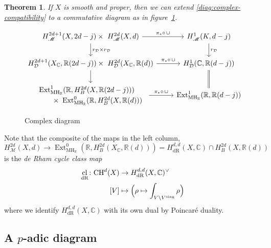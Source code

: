 \documentclass[11pt, a4paper, reqno]{amsart}
\theoremstyle{definition}
\theoremstyle{plain}
\newtheorem{theorem}[definition]{Theorem}
\theoremstyle{remark}
\DeclareMathOperator{\Ext}{Ext}
\DeclareMathOperator{\cl}{cl}
\DeclareMathOperator{\dR}{dR}
\DeclareMathOperator{\mot}{\mathscr{M}}
\newcommand{\numberset}{\mathbb}
\newcommand{\C}{\numberset{C}}
\newcommand{\R}{\numberset{R}}
\newcommand{\CH}{\mathrm{CH}}
\newcommand{\MH}{\mathrm{MH}}
\newcommand{\del}{\mathcal{D}}
\newcommand{\regulator}[1]{r_{#1}}
\newcommand{\rD}{\regulator{\del}}
\begin{document}
  \begin{theorem}
   If $X$ is smooth and proper, then we can extend \eqref{diag:complex-compatibility} to a commutative diagram as in figure~\ref{diag:complex-diagram}.
  \end{theorem}

  \begin{figure}[b]
   \centering
   \begin{mdframed}
    \caption{Complex diagram}
    \label{diag:complex-diagram}
    \[
     \begin{tikzcd}
      H^{2d+1}_{\mot}(X,2d-j) \times\ H^{2d}_{\mot}(X,d)
      \arrow["\pi_* \circ\, \cup"]{r} \arrow["\rD \times \rD"]{d} &
      H^1_{\mot}(K,d-j) \arrow[d,"\rD"] \\
       H_{\del}^{2d+1}(X_{\C}, \R(2d-j))
       \times\ H_{\del}^{2d}(X_{\C}, \R(d))
      \arrow["\pi_* \circ\, \cup"]{r} \arrow{d} &
      H^1_{\del}(\C, \R(d-j)) \arrow[equal]{d} \\
      \begin{array}{l}
       \Ext^1_{\MH_\R}(\R, H_B^{2d}(X, \R(2d-j))) \\[0.5ex]
       \qquad \times\ \Ext^0_{\MH_\R}(\R, H_B^{2d}(X,\R(d)))
       \end{array} \arrow["\pi_* \circ\, \cup"]{r} &
      \Ext^1_{\MH_\R}(\R, \R(d - j))
     \end{tikzcd}
    \]
   \end{mdframed}
  \end{figure}

  Note that the composite of the maps in the left column,
  \[
   H^{2d}_{\mot}(X, d) %
   \to \Ext^0_{\MH_\R}(\R, H_B^{2d}(X_{\C},\R(d))) = H^{d, d}_{\dR}(X, \C) \cap H^{2d}_B(X, \R(d))
  \]
  is the \emph{de Rham cycle class map}
  \begin{equation}
   \label{def:cycle-class-map}
   \begin{aligned}
    \cl_{\dR} \colon \CH^d(X) &\to H^{d,d}_{\dR}(X,\C)^{\vee} \\
    [V] &\mapsto \Bigl( \rho \mapsto \int_{V\setminus V^{\mathrm{sing}}} \rho \Bigr)
   \end{aligned}
  \end{equation}
  where we identify $H^{d,d}_{\dR}(X,\C)$ with its own dual by Poincar\'e duality.
  
 \subsection{A \texorpdfstring{$p$}{p}-adic diagram}
  \label{sec:p-adic-diagram}
\end{document}
